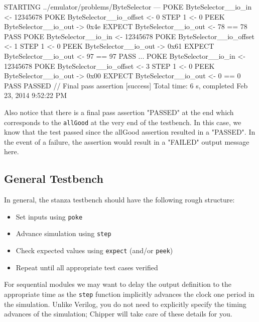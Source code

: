 \begin{bash}
STARTING ../emulator/problems/ByteSelector
---
POKE ByteSelector__io_in <- 12345678
POKE ByteSelector__io_offset <- 0
STEP 1 <- 0
PEEK ByteSelector__io_out -> 0x4e
EXPECT ByteSelector__io_out <- 78 == 78 PASS
POKE ByteSelector__io_in <- 12345678
POKE ByteSelector__io_offset <- 1
STEP 1 <- 0
PEEK ByteSelector__io_out -> 0x61
EXPECT ByteSelector__io_out <- 97 == 97 PASS
...
POKE ByteSelector__io_in <- 12345678
POKE ByteSelector__io_offset <- 3
STEP 1 <- 0
PEEK ByteSelector__io_out -> 0x00
EXPECT ByteSelector__io_out <- 0 == 0 PASS
PASSED   // Final pass assertion
[success] Total time: 6 s, completed Feb 23, 2014 9:52:22 PM
\end{bash}

Also notice that there is a final pass assertion "PASSED" at the end which corresponds to the \verb+allGood+ at the very end of the testbench. In this case, we know that the test passed since the allGood assertion resulted in a "PASSED". In the event of a failure, the assertion would result in a "FAILED" output message here.

\subsection{General Testbench}

In general, the stanza testbench should have the following rough structure:

\begin{itemize}
\item Set inputs using \verb+poke+
\item Advance simulation using \verb+step+
\item Check expected values using \verb+expect+ (and/or \verb+peek+)
\item Repeat until all appropriate test cases verified
\end{itemize}

For sequential modules we may want to delay the output definition to the appropriate time as the \verb+step+ function implicitly advances the clock one period in the simulation. Unlike Verilog, you do not need to explicitly specify the timing advances of the simulation; Chipper will take care of these details for you.

\section{}

